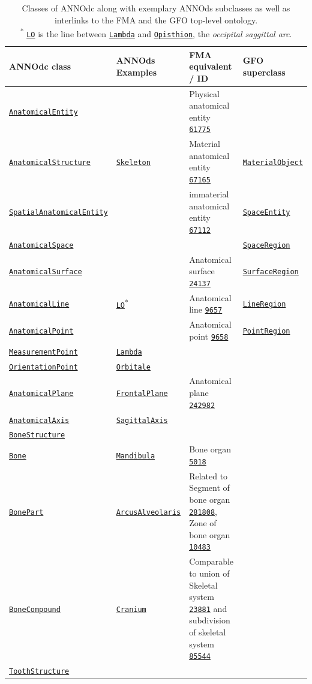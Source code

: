 \documentclass[sw]{iosart2x}
\newcommand{\anno}[1]{\href{https://annosaxfdm.de/ontology/#1}{\texttt{#1}}}
\newcommand{\gfo}[1]{\href{https://www.onto-med.de/ontologies/gfo/#1}{\texttt{#1}}}
\newcommand{\fma}[1]{\href{http://purl.org/sig/ont/fma/fma#1}{\texttt{#1}}}
\begin{document}
\begin{table}[b]
  \centering
  \caption{Classes of ANNOdc along with exemplary ANNOds subclasses as well as interlinks to the FMA and the GFO top-level ontology.\\
  \textsuperscript{*} \anno{LO} is the line between \anno{Lambda} and \anno{Opisthion}, the \emph{occipital saggittal arc}.}
  \label{tab:core}
  \begin{tabulary}{\textwidth}{llLl}
    \toprule
	ANNOdc class					&ANNOds Examples				&FMA equivalent / ID						&GFO superclass	\\
	\midrule
	\anno{AnatomicalEntity}			&						&Physical anatomical entity \fma{61775}\\
	\anno{AnatomicalStructure}		&\anno{Skeleton}		&Material anatomical entity	\fma{67165}		&\gfo{MaterialObject}\\
	\anno{SpatialAnatomicalEntity}	&						&immaterial anatomical entity \fma{67112}	&\gfo{SpaceEntity}\\
	\anno{AnatomicalSpace}			&						&											&\gfo{SpaceRegion}\\
	\anno{AnatomicalSurface}		&						&Anatomical surface \fma{24137}			&\gfo{SurfaceRegion}\\
	\anno{AnatomicalLine}			&\anno{LO}\textsuperscript{*}	&Anatomical line \fma{9657}	&\gfo{LineRegion}\\
	\anno{AnatomicalPoint}			&						&Anatomical point \fma{9658}							&\gfo{PointRegion}\\
	\anno{MeasurementPoint}			&\anno{Lambda}\\%
	\anno{OrientationPoint}			&\anno{Orbitale}\\
	\anno{AnatomicalPlane}			&\anno{FrontalPlane}	&Anatomical plane \fma{242982}\\
	\anno{AnatomicalAxis}		 	&\anno{SagittalAxis}\\
	\anno{BoneStructure}\\
	\anno{Bone}						&\anno{Mandibula}				&Bone organ \fma{5018}\\
	\anno{BonePart}					&\anno{ArcusAlveolaris}	&Related to Segment of bone organ \fma{281808}, Zone of bone organ \fma{10483}\\
	\anno{BoneCompound}				&\anno{Cranium}				&Comparable to union of Skeletal system \fma{23881} and subdivision of skeletal system \fma{85544}\\
	\anno{ToothStructure}\\%

\end{tabulary}
\end{table}
\end{document}
